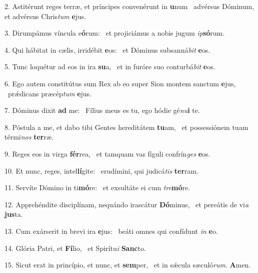 2. Astitérunt reges terræ, et príncipes convenérunt in \textbf{u}num \ast\  advérsus Dóminum, et advérsus Chris\textit{tum} \textbf{e}jus.\

3. Dirumpámus víncula e\textbf{ó}rum: \ast\  et projiciámus a nobis jugum \textit{ip}\textbf{só}rum.\

4. Qui hábitat in cælis, irridébit \textbf{e}os: \ast\  et Dóminus subsanná\textit{bit} \textbf{e}os.\

5. Tunc loquétur ad eos in ira \textbf{su}a, \ast\  et in furóre suo conturbá\textit{bit} \textbf{e}os.\

6. Ego autem constitútus sum Rex ab eo super Sion montem sanctum \textbf{e}jus, \ast\  prǽdicans præcép\textit{tum} \textbf{e}jus.\

7. Dóminus dixit \textbf{ad} me: \ast\  Fílius meus es tu, ego hódie gé\textit{nu}\textbf{i} te.\

8. Póstula a me, et dabo tibi Gentes hereditátem \textbf{tu}am, \ast\  et possessiónem tuam térmi\textit{nos} \textbf{ter}ræ.\

9. Reges eos in virga \textbf{fér}rea, \ast\  et tamquam vas fíguli confrín\textit{ges} \textbf{e}os.\

10. Et nunc, reges, intel\textbf{lí}gite: \ast\  erudímini, qui judicá\textit{tis} \textbf{ter}ram.\

11. Servíte Dómino in ti\textbf{mó}re: \ast\  et exsultáte ei cum \textit{tre}\textbf{mó}re.\

12. Apprehéndite disciplínam, nequándo irascátur \textbf{Dó}minus, \ast\  et pereátis de vi\textit{a} \textbf{jus}ta.\

13. Cum exárserit in brevi ira \textbf{e}jus: \ast\  beáti omnes qui confídunt \textit{in} \textbf{e}o.\

14. Glória Patri, et \textbf{Fí}lio, \ast\  et Spirítu\textit{i} \textbf{Sanc}to.\

15. Sicut erat in princípio, et nunc, et \textbf{sem}per, \ast\  et in sǽcula sæculó\textit{rum}. \textbf{A}men.\

